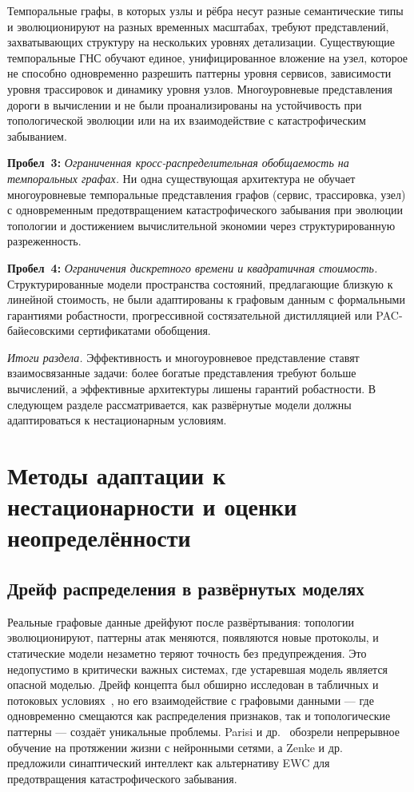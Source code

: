 Темпоральные графы, в которых узлы и рёбра несут разные семантические типы и эволюционируют на разных временных масштабах, требуют представлений, захватывающих структуру на нескольких уровнях детализации. Существующие темпоральные ГНС обучают единое, унифицированное вложение на узел, которое не способно одновременно разрешить паттерны уровня сервисов, зависимости уровня трассировок и динамику уровня узлов. Многоуровневые представления дороги в вычислении и не были проанализированы на устойчивость при топологической эволюции или на их взаимодействие с катастрофическим забыванием.

\medskip
\noindent\textbf{Пробел~3:} \emph{Ограниченная кросс-распределительная обобщаемость на темпоральных графах.} Ни одна существующая архитектура не обучает многоуровневые темпоральные представления графов (сервис, трассировка, узел) с одновременным предотвращением катастрофического забывания при эволюции топологии и достижением вычислительной экономии через структурированную разреженность.

\medskip
\noindent\textbf{Пробел~4:} \emph{Ограничения дискретного времени и квадратичная стоимость.} Структурированные модели пространства состояний, предлагающие близкую к линейной стоимость, не были адаптированы к графовым данным с формальными гарантиями робастности, прогрессивной состязательной дистилляцией или PAC-байесовскими сертификатами обобщения.

\medskip
\noindent\textit{Итоги раздела.} Эффективность и многоуровневое представление ставят взаимосвязанные задачи: более богатые представления требуют больше вычислений, а эффективные архитектуры лишены гарантий робастности. В следующем разделе рассматривается, как развёрнутые модели должны адаптироваться к нестационарным условиям.


\section{Методы адаптации к нестационарности и оценки неопределённости}
\label{sec:nonstationarity}

\subsection{Дрейф распределения в развёрнутых моделях}

Реальные графовые данные дрейфуют после развёртывания: топологии эволюционируют, паттерны атак меняются, появляются новые протоколы, и статические модели незаметно теряют точность без предупреждения. Это недопустимо в критически важных системах, где устаревшая модель является опасной моделью. Дрейф концепта был обширно исследован в табличных и потоковых условиях~\cite{Gama2014,Lu2019}, но его взаимодействие с графовыми данными --- где одновременно смещаются как распределения признаков, так и топологические паттерны --- создаёт уникальные проблемы. Parisi и др.~\cite{Parisi2019} обозрели непрерывное обучение на протяжении жизни с нейронными сетями, а Zenke и др.~\cite{Zenke2017,Wilson2020} предложили синаптический интеллект как альтернативу EWC для предотвращения катастрофического забывания.


